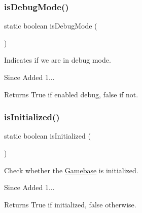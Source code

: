 \subsubsection{\texorpdfstring{is\+Debug\+Mode()}{isDebugMode()}}
{\footnotesize\ttfamily static boolean is\+Debug\+Mode (\begin{DoxyParamCaption}{ }\end{DoxyParamCaption})\hspace{0.3cm}{\ttfamily [static]}}



Indicates if we are in debug mode. 

\begin{DoxySince}{Since}
Added 1... 
\end{DoxySince}
\begin{DoxyReturn}{Returns}
True if enabled debug, false if not. 
\end{DoxyReturn}
\mbox{\label{classcom_1_1toast_1_1android_1_1gamebase_1_1_gamebase_a40e7b7b4c19a8bf4140aa22033ab6489}} 
\subsubsection{\texorpdfstring{is\+Initialized()}{isInitialized()}}
{\footnotesize\ttfamily static boolean is\+Initialized (\begin{DoxyParamCaption}{ }\end{DoxyParamCaption})\hspace{0.3cm}{\ttfamily [static]}}



Check whether the \hyperlink{classcom_1_1toast_1_1android_1_1gamebase_1_1_gamebase}{Gamebase} is initialized. 

\begin{DoxySince}{Since}
Added 1... 
\end{DoxySince}
\begin{DoxyReturn}{Returns}
True if initialized, false otherwise. 
\end{DoxyReturn}
\mbox{\label{classcom_1_1toast_1_1android_1_1gamebase_1_1_gamebase_ab2dc0892a980b519fd76e15bcecb3bb5}} 
